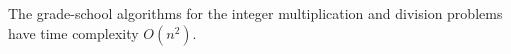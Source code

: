 \begin{note} \label{note:Grade-school-algorithms-for-multiplication-and-division}
The grade-school algorithms for the integer multiplication and division problems have time complexity $O(n^2)$. %
\end{note}




